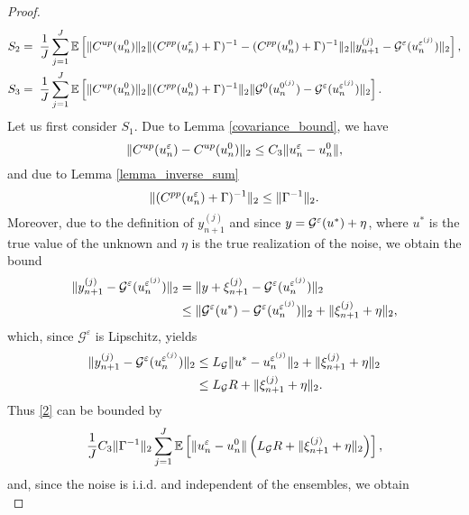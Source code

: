 \begin{proof}
\begin{align}
S_2 &= \; \frac{1}{J} \sum_{j=1}^J \mathbb{E} \left [ \lVert C^{up}(u_n^0)\rVert_2 \lVert(C^{pp}(u_n^{\varepsilon}) + \Gamma)^{-1} - (C^{pp}(u_n^0) + \Gamma)^{-1}\rVert_2 \lVert y_{n+1}^{(j)} - \mathcal{G}^{\varepsilon}(u_n^{\varepsilon^{(j)}})\rVert_2 \right ], \\ \label{4}
S_3 &= \; \frac{1}{J} \sum_{j=1}^J \mathbb{E} \left [ \lVert C^{up}(u_n^0)\rVert_2 \lVert(C^{pp}(u_n^0) + \Gamma)^{-1}\rVert_2 \lVert\mathcal{G}^0(u_n^{0^{(j)}}) - \mathcal{G}^{\varepsilon}(u_n^{\varepsilon^{(j)}})\rVert_2 \right ].
\end{align}
Let us first consider $S_1$. Due to Lemma \ref{covariance_bound}, we have
\begin{equation*}
\lVert C^{up}(u_n^{\varepsilon}) - C^{up}(u_n^0)\rVert_2 \le C_3 \lVert u_n^{\varepsilon} - u_n^0\rVert,
\end{equation*}
and due to Lemma \ref{lemma_inverse_sum}
\begin{equation*}
\lVert(C^{pp}(u_n^{\varepsilon}) + \Gamma)^{-1}\rVert_2 \le \lVert\Gamma^{-1}\rVert_2.
\end{equation*}
Moreover, due to the definition of $y_{n+1}^{(j)}$ and since $y = \mathcal G^\varepsilon(u^*) + \eta$, where $u^*$ is the true value of the unknown and $\eta$ is the true realization of the noise, we obtain the bound
\begin{align*}
\lVert y_{n+1}^{(j)} - \mathcal{G}^{\varepsilon}(u_n^{\varepsilon^{(j)}})\rVert_2 = & \; \lVert y + \xi_{n+1}^{(j)} - \mathcal{G}^{\varepsilon}(u_n^{\varepsilon^{(j)}})\rVert_2 \\
\le & \; \lVert\mathcal{G}^{\varepsilon}(u^*) - \mathcal{G}^{\varepsilon}(u_n^{\varepsilon^{(j)}})\rVert_2 + \lVert\xi_{n+1}^{(j)} + \eta\rVert_2,
\end{align*}
which, since $\mathcal{G}^{\varepsilon}$ is Lipschitz, yields
\begin{align*}
\lVert y_{n+1}^{(j)} - \mathcal{G}^{\varepsilon}(u_n^{\varepsilon^{(j)}})\rVert_2 \le & \; L_{\mathcal{G}} \lVert u^* - u_n^{\varepsilon^{(j)}}\rVert_2 + \lVert\xi_{n+1}^{(j)} + \eta\rVert_2 \\
\le & \; L_{\mathcal{G}} R + \lVert\xi_{n+1}^{(j)} + \eta\rVert_2.
\end{align*}
Thus \eqref{2} can be bounded by
\begin{equation*}
\frac{1}{J} C_3 \lVert\Gamma^{-1}\rVert_2 \sum_{j=1}^J \mathbb{E} \left [ \lVert u_n^{\varepsilon} - u_n^0\rVert \left( L_{\mathcal{G}} R + \lVert\xi_{n+1}^{(j)} + \eta\rVert_2 \right) \right ],
\end{equation*}
and, since the noise is i.i.d. and independent of the ensembles, we obtain
\begin{equation*}

\end{equation*}
\end{proof}
